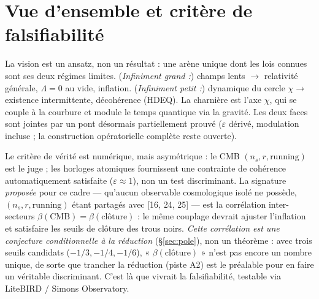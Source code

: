 \documentclass[11pt,a4paper]{article}
\theoremstyle{definition}
\begin{document}
\section{Vue d'ensemble et crit\`ere de falsifiabilit\'e}
La vision est un ansatz, non un r\'esultat : une ar\`ene unique dont les lois connues sont ses
deux r\'egimes limites. (\emph{Infiniment grand :}) champs lents $\to$ relativit\'e g\'en\'erale,
$\Lambda=0$ au vide, inflation. (\emph{Infiniment petit :}) dynamique du cercle $\chi\to$
existence intermittente, d\'ecoh\'erence (HDEQ). La charni\`ere est l'axe $\chi$, qui se couple
\`a la courbure et module le temps quantique via la gravit\'e. Les deux faces sont jointes par
un pont d\'esormais partiellement prouv\'e ($\varepsilon$ d\'eriv\'e, modulation incluse ; la
construction op\'eratorielle compl\`ete reste ouverte).

Le crit\`ere de v\'erit\'e est num\'erique, mais asym\'etrique : le CMB
$(n_s,r,\text{running})$ est le juge ; les horloges atomiques fournissent une contrainte de
coh\'erence automatiquement satisfaite ($\varepsilon\approx1$), non un test discriminant. La
signature \emph{propos\'ee} pour ce cadre --- qu'aucun observable cosmologique isol\'e ne
poss\`ede, $(n_s,r,\text{running})$ \'etant partag\'es avec [16, 24, 25] --- est la corr\'elation
inter-secteurs $\beta(\mathrm{CMB})=\beta(\text{cl\^oture})$ : le m\^eme couplage devrait ajuster
l'inflation et satisfaire les seuils de cl\^oture des trous noirs. \emph{Cette corr\'elation est
une conjecture conditionnelle \`a la r\'eduction} (\S\ref{sec:pole}), non un th\'eor\`eme : avec
trois seuils candidats ($-1/3,-1/4,-1/6$), « $\beta(\text{cl\^oture})$ » n'est pas encore un
nombre unique, de sorte que trancher la r\'eduction (piste A2) est le pr\'ealable pour en faire
un v\'eritable discriminant. C'est l\`a que vivrait la falsifiabilit\'e, testable via
LiteBIRD / Simons Observatory.

\end{document}
